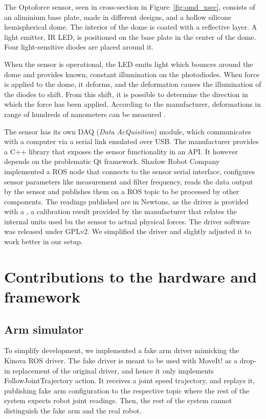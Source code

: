 \documentclass[buriama8_dp.tex]{subfiles}
\begin{document}
The Optoforce sensor, seen in cross-section in Figure~\ref{fig:omd_xsec}, consists of an aliminium base plate, made in different designs, and a hollow silicone hemispherical dome. The interior of the dome is coated with a reflective layer. A light emitter, IR LED, is positioned on the base plate in the center of the dome. Four light-sensitive diodes are placed around it.

When the sensor is operational, the LED emits light which bounces around the dome and provides known, constant illumination on the photodiodes. When force is applied to the dome, it deforms, and the deformation causes the illumination of the diodes to shift. From this shift, it is possible to determine the direction in which the force has been applied. According to the manufacturer, deformations in range of hundreds of nanometers can be measured \cite{opto_whitep}.

The sensor has its own DAQ (\emph{Data AcQuisition}) module, which communicates with a computer via a serial link emulated over USB. The manufacturer provides a C++ library that exposes the sensor functionality in an API. It however depends on the problematic Qt framework. Shadow Robot Company \cite{opto_driver}  implemented a ROS node that connects to the sensor serial interface, configures sensor parameters like measurement and filter frequency, reads the data output by the sensor and publishes them on a ROS topic to be processed by other components. The readings published are in Newtons, as the driver is provided with a , a calibration result provided by the manufacturer that relates the internal units used bu the sensor to actual physical forces. The driver software was released under GPLv2. We simplified the driver and slightly adjusted it to work better in our setup.


\section{Contributions to the hardware and framework}
\label{sec:hw_contrib}

\subsection{Arm simulator}
\label{subsec:arm_sim}

To simplify development, we implemented a fake arm driver mimicking the Kinova ROS driver. The fake driver is meant to be used with MoveIt! as a drop-in replacement of the original driver, and hence it only implements FollowJointTrajectory action. It receives a joint speed trajectory, and replays it, publishing fake arm configuration to the respective topic where the rest of the system expects robot joint readings. Then, the rest of the system cannot distinguish the fake arm and the real robot.
\end{document}

